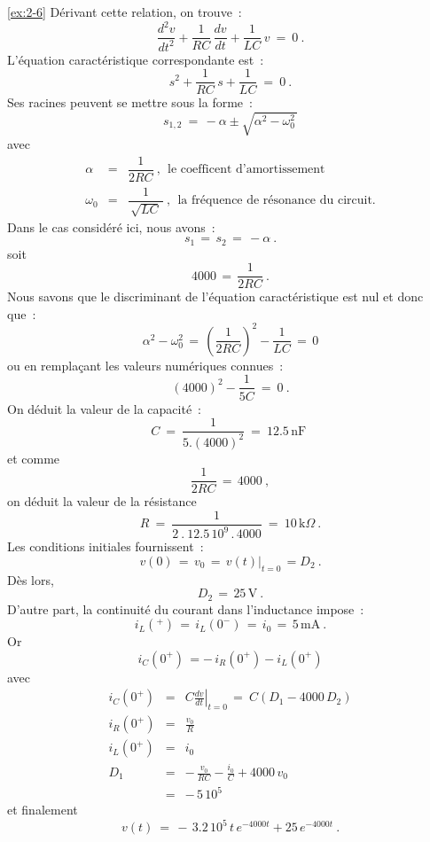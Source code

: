 \begin{solexercise}{\ref{ex:2-6}}
D\'erivant cette relation, on trouve~:
\[ \dfrac{d^2v}{dt^2} + \dfrac{1}{RC} \, \dfrac{dv}{dt} + \dfrac{1}{LC} \, v \: = \: 0~. \]
L'\'equation caract\'eristique correspondante est~:
\[ s^2 + \dfrac{1}{RC} \, s + \dfrac{1}{LC} \: = \: 0~. \]
Ses racines peuvent se mettre sous la forme~:
\[ s_{1,2} \: = \, -\alpha \pm \sqrt{\alpha^2 - \omega_0^2\,} \]
avec
\begin{eqnarray*}
	\alpha &=& \dfrac{1}{2RC}~, ~~\mbox{le coefficent d'amortissement}\\
	\omega_0 &=& \dfrac{1}{\, \sqrt{LC}\,}~, ~~\mbox{la fr\'equence de r\'esonance du circuit.}
\end{eqnarray*}
Dans le cas consid\'er\'e ici, nous avons~:
\[ s_1 \, =\,  s_2\, =\,  -\alpha~. \]
soit
\[ 4000 \, =\,  \dfrac{1}{2RC}~. \]
Nous savons que le discriminant de l'\'equation caract\'eristique est nul et donc que~:
\[ \alpha^2 - \omega_0^2 \, = \, \left( \dfrac{1}{2RC}\right)^2 - \dfrac{1}{LC} \, = \, 0 \]
ou en rempla\c{c}ant les valeurs num\'eriques connues~:
\[  (4000)^2 - \dfrac{1}{5C} \: = \: 0~. \]
On d\'eduit la valeur de la capacit\'e~:
\[ C \: = \: \dfrac{1}{5.(4000)^2} \: = \: 12.5\, \mbox{nF~} \]
et comme
\[ \dfrac{1}{2RC} \, = \, 4000~,\]
on d\'eduit la valeur de la r\'esistance
\[ R \: = \: \dfrac{1}{2\: . \: 12.5\, 10^9\, . \, 4000} \: = \: 10\,\mbox{k}\Omega~. \]
Les conditions initiales fournissent~:
\[ v(0) \, = \, v_0 \, = \, \left. v(t)\right|_{t=0} \,=  D_2~. \]
D\`es lors,
\[ D_2 \, = \, 25\, \mbox{V}~. \]
D'autre part, la continuit\'e du courant dans l'inductance impose~:
\[ i_L(^+) \, = \, i_L(0^-) \, = \, i_0 \, = \, 5\, \mbox{mA}~.\]
Or
\[ i_C(0^+) \, = -\, i_R(0^+) - i_L(0^+) \]
avec
\begin{eqnarray*}
	i_C(0^+) &=& C \left. \frac{dv}{dt}\right|_{t=0} \, = \: C\left( D_1 - 4000\, D_2 \right)\\
	i_R(0^+) &=& \frac{v_0}{R}\\
	i_L(0^+) &=& i_0\\
	D_1 &=& -\, \frac{v_0}{RC} - \frac{i_0}{C} + 4000\, v_0\\
	&=& -\, 5\, 10^5
\end{eqnarray*}
et finalement
\[ v(t) \: = \, -\, 3.2\, 10^5\, t \, e^{-4000t} + 25\, e^{-4000t}~. \]
\end{solexercise}

